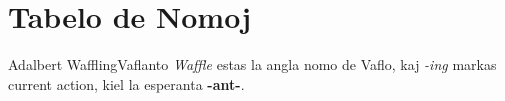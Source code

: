 \chapter*{Tabelo de Nomoj}

Adalbert Waffling\dotfillAdalbert Vaflanto
\emph{Waffle} estas la angla nomo de Vaflo, kaj \emph{-ing} markas current action, kiel la esperanta \textbf{-ant-}.